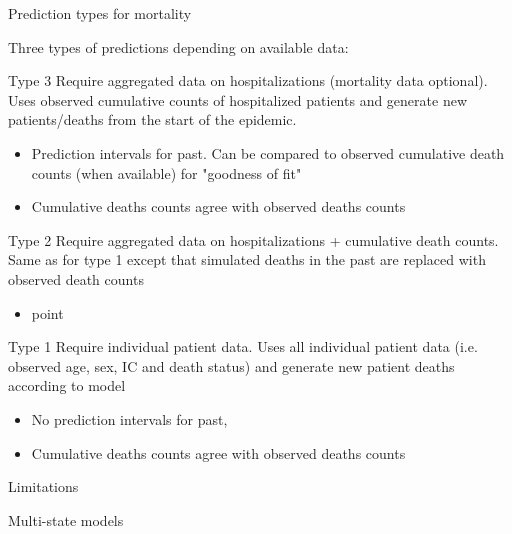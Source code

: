 \documentclass[t,9pt,xcolor=dvipsnames]{beamer}              %
\begin{document}
\begin{frame}{Prediction types for mortality}
\justifying

Three  types of predictions depending on available data:
\pause

\alert{Type 3}
Require aggregated data on hospitalizations (mortality data optional). Uses observed cumulative counts of hospitalized patients and generate new patients/deaths from the start of the epidemic.
\begin{itemize}
\item Prediction intervals for past. Can be compared to observed cumulative death counts (when available) for "goodness of fit"
\item Cumulative deaths counts agree with observed deaths counts
\end{itemize}
\pause

\alert{Type 2}
Require aggregated data on hospitalizations + cumulative death counts. Same as for type 1 except that simulated deaths in the past are replaced with observed death counts
\begin{itemize}
\item point
\end{itemize}
\pause

\alert{Type 1}
Require individual patient data. Uses all individual patient data (i.e. observed age, sex, IC and death status) and generate new patient deaths according to model
\begin{itemize}
\item No prediction intervals for past, 
\item Cumulative deaths counts agree with observed deaths counts
\end{itemize}






\note{
\tiny
\justifying

}
\end{frame}

\begin{frame}{Limitations}
\justifying




Multi-state models



\note{
\tiny
\justifying

}
\end{frame}
\end{document}
